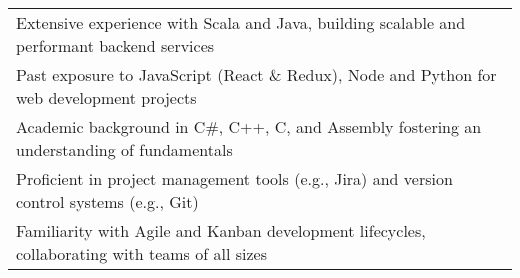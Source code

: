 \fontsize{11pt}{1.4em}\bodyfontlight\upshape\color{text}
\begin{tabular*}{\textwidth}{@{\hspace{4mm}\textbullet\hspace{2mm}} l @{\extracolsep{\fill}}}
    Extensive experience with Scala and Java, building scalable and performant backend services  \\
    Past exposure to JavaScript (React \& Redux), Node and Python for web development projects\\
    Academic background in C\#, C++, C, and Assembly fostering an understanding of fundamentals\\
    Proficient in project management tools (e.g., Jira) and version control systems (e.g., Git) \\
    Familiarity with Agile and Kanban development lifecycles, collaborating with teams of all sizes
\end{tabular*}
